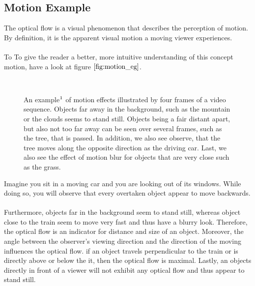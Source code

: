 \subsection{Motion Example}
The optical flow is a visual phenomenon that describes the perception of motion.
By definition, it is the apparent visual motion a moving viewer experiences. \\ \\
To To give the reader a better, more intuitive understanding of this concept motion, have a look at figure $\ref{fig:motion_eg}$.
\begin{figure}[H]
\begin{center}
~
\end{center}
\caption[Motion Example]{An example$\footnotemark$ of motion effects illustrated by four frames of a video sequence. Objects far away in the background, such as the mountain or the clouds seems to stand still. Objects being a fair distant apart, but also not too far away can be seen over several frames, such as the tree, that is passed. In addition, we also see observe, that the tree moves along the opposite direction as the driving car. Last, we also see the effect of motion blur for objects that are very close such as the grass.}
\label{fig:motion_eg}
\end{figure}
Imagine you sit in a moving car and you are looking out of its windows. While doing so, you will observe that every overtaken object appear to move backwards. \\ \\
Furthermore, objects far in the background seem to stand still, whereas object close to the train seem to move very fast and thus have a blurry look. Therefore, the optical flow is an indicator for distance and size of an object. Moreover, the angle between the observer's viewing direction and the direction of the moving influences the optical flow. if an object travels perpendicular to the train or is directly above or below the it, then the optical flow is maximal. Lastly, an objects directly in front of a viewer will not exhibit any optical flow and thus appear to stand still. \\ \\
